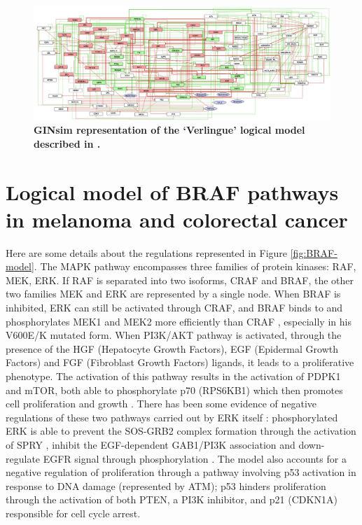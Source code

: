 \documentclass[a4paper,12pt,twoside,onecolumn,openright,final,oldfontcommands]{memoir}
\begin{document}
\begin{figure}

{\centering \includegraphics[width=0.9\linewidth]{fig/Verlingue} 

}

\caption[GINsim representation of the "Verlingue" logical model described in Verlingue et al.]{\textbf{GINsim representation of the `Verlingue'
logical model described in \citet{verlingue2016silico}.}}\label{fig:Verlingue}
\end{figure}




\section{Logical model of BRAF pathways in melanoma and colorectal
cancer}\label{appendix-pantolini}

Here are some details about the regulations represented in Figure
\ref{fig:BRAF-model}. The MAPK pathway encompasses three families of
protein kinases: RAF, MEK, ERK. If RAF is separated into two isoforms,
CRAF and BRAF, the other two families MEK and ERK are represented by a
single node. When BRAF is inhibited, ERK can still be activated through
CRAF, and BRAF binds to and phosphorylates MEK1 and MEK2 more
efficiently than CRAF \citep{wellbrock2004raf}, especially in his
V600E/K mutated form. When PI3K/AKT pathway is activated, through the
presence of the HGF (Hepatocyte Growth Factors), EGF (Epidermal Growth
Factors) and FGF (Fibroblast Growth Factors) ligands, it leads to a
proliferative phenotype. The activation of this pathway results in the
activation of PDPK1 and mTOR, both able to phosphorylate p70 (RPS6KB1)
which then promotes cell proliferation and growth
\citep{uniprot2019uniprot}. There has been some evidence of negative
regulations of these two pathways carried out by ERK itself
\citep{lake2016negative}: phosphorylated ERK is able to prevent the
SOS-GRB2 complex formation through the activation of SPRY
\citep{edwin2009intermolecular}, inhibit the EGF-dependent GAB1/PI3K
association \citep{lehr2004identification} and down-regulate EGFR signal
through phosphorylation \citep{lake2016negative}. The model also
accounts for a negative regulation of proliferation through a pathway
involving p53 activation in response to DNA damage (represented by ATM);
p53 hinders proliferation through the activation of both PTEN, a PI3K
inhibitor, and p21 (CDKN1A) responsible for cell cycle arrest.
\end{document}
